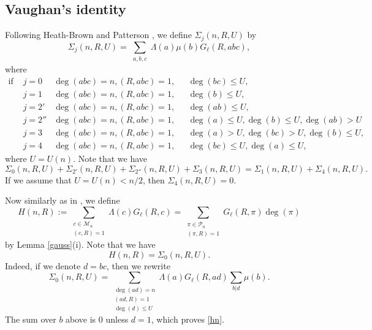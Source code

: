\documentclass[12pt]{amsart}
\begin{document}
\subsection{Vaughan's identity}
Following Heath-Brown and Patterson \cite{hbp},  we define $\Sigma_j(n,R,U)$ by
$$\Sigma_j(n,R, U) = \sum_{\substack{a,b,c}} \Lambda(a) \mu(b) {G}_\ell (R, abc),$$
where 
\begin{align*}
\text{if   } &j=0 &\deg(abc)=n, (R, abc)=1, \, \, \,  \,  &\deg(bc) \leq U, \\
&j=1 &\deg(abc)=n, (R, abc)=1, \, \, \, \,   &\deg(b) \leq U, \\
&j=2' &\deg(abc)=n, (R, abc)=1,\, \, \, \,   &\deg(ab) \leq U, \\
&j=2'' &\deg(abc)=n, (R, abc)=1,\, \, \, \,   &\deg(a) \leq U, \deg(b) \leq U, \deg(ab) >U \\
&j=3 &\deg(abc)=n, (R, abc)=1,\, \, \, \,   &\deg(a) > U,  \deg(bc)>U, \deg(b) \leq U,\\
&j=4 &\deg(abc)=n, (R, abc)=1,\, \, \, \,   &\deg(bc) \leq U,  \deg(a) \leq U, 
\end{align*} where $U=U(n)$.
Note that we have 
\begin{equation}
\label{sumsigma}
\Sigma_0(n,R,U) + \Sigma_{2'}(n,R,U)+ \Sigma_{2''}(n,R,U)+\Sigma_3(n,R,U) = \Sigma_1(n,R,U)+\Sigma_4(n,R,U).
\end{equation}
If we assume that  $U=U(n) <n/2$, then $\Sigma_4(n,R,U)=0$.

Now similarly as in \cite{hbp}, we define
$$H(n, R) := \sum_{\substack{c \in \mathcal{M}_n\\ (c, R)=1}} \Lambda(c) G_\ell(R, c) = \sum_{\substack{\pi \in \mathcal{P}_n\\ (\pi, R)=1}} G_\ell(R, \pi) \deg(\pi)$$
by Lemma \ref{gauss}(i).
Note that we have
\begin{equation}
H(n, R) = \Sigma_0(n,R, U).
\label{hn}
\end{equation}
Indeed,  if we denote $d=bc$, then we rewrite
$$\Sigma_0(n,R,U) = \sum_{\substack{\deg(ad)= n \\ (ad, R)=1 \\\deg(d) \leq U}} \Lambda(a) G_\ell(R, ad) \sum_{b|d} \mu(b).$$
The sum over $b$ above is $0$ unless $d=1$,  which proves \eqref{hn}.
\end{document}
